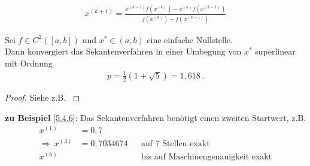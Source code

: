 \begin{gather}
x^{(k+1)} = \frac{x^{(k-1)}f(x^{(k)}) - x^{(k)}f(x^{(k-1)})}{f(x^{(k)})-f(x^{(k-1)})}
\label{V.4.2}
\end{gather}



\begin{Satze}
	Sei $f\in C^2([a,b])$ und $x^{*}\in (a,b)$ eine einfache Nullstelle.\\
	Dann konvergiert das Sekantenverfahren in einer Umbegung von $x^{*}$
	superlinear mit Ordnung 
	\begin{gather*}
	p=\frac{1}{2}(1+\sqrt{5})= 1,618 \, .
	\end{gather*}
\end{Satze}

\begin{proof}
	Siehe z.B. \cite[][Zwischenwertsatz, Fibonacci-Folge]{haemmerlinhoffmann,stoerbulirsch}
\end{proof}

\textbf{zu Beispiel} \ref{5.4.6}: Das Sekantenverfahren benötigt
einen zweiten Startwert, z.B.
\begin{align*}
x^{(1)}&=0,7 \\
\Rightarrow ~ x^{(3)} &= 0,7034674 
&&\text{auf 7 Stellen exakt}\\
x^{(6)} &&& \text{bis auf Maschinengenauigkeit exakt}
\end{align*}


